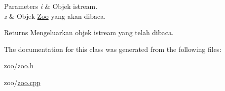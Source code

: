 \begin{DoxyParams}{Parameters}
{\em i} & Objek istream. \\
\hline
{\em z} & Objek \hyperlink{classZoo}{Zoo} yang akan dibaca. \\
\hline
\end{DoxyParams}
\begin{DoxyReturn}{Returns}
Mengeluarkan objek istream yang telah dibaca. 
\end{DoxyReturn}


The documentation for this class was generated from the following files\+:\begin{DoxyCompactItemize}
\item 
zoo/\hyperlink{zoo_8h}{zoo.\+h}\item 
zoo/\hyperlink{zoo_8cpp}{zoo.\+cpp}\end{DoxyCompactItemize}
